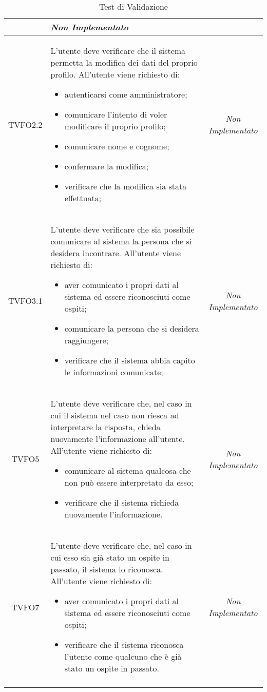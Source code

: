 \begin{longtable}{|c|>{}m{8cm}|c|}
\begin{itemize}
	\end{itemize} & \textit{Non Implementato}\\ \hline
	\hypertarget{TVFO2.2}{TVFO2.2} & L'utente deve verificare che il sistema permetta la modifica dei dati del proprio profilo. All'utente viene richiesto di:
	\begin{itemize}
		\item autenticarsi come amministratore;
		\item comunicare l'intento di voler modificare il proprio profilo;
		\item comunicare nome e cognome;
		\item confermare la modifica;
		\item verificare che la modifica sia stata effettuata;
	\end{itemize}
	& \textit{Non Implementato}\\ \hline
	\hypertarget{TVFO3.1}{TVFO3.1} & L'utente deve verificare che sia possibile comunicare al sistema la persona che si desidera incontrare. All'utente viene richiesto di:
	\begin{itemize}
		\item aver comunicato i propri dati al sistema ed essere riconosciuti come ospiti;
		\item comunicare la persona che si desidera raggiungere;
		\item verificare che il sistema abbia capito le informazioni comunicate;
	\end{itemize} & \textit{Non Implementato}\\ \hline
	\hypertarget{TVFO5}{TVFO5} & L'utente deve verificare che, nel caso in cui il sistema nel caso non riesca ad interpretare la risposta, chieda nuovamente l'informazione all'utente. All'utente viene richiesto di:
	\begin{itemize}
		\item comunicare al sistema qualcosa che non può essere interpretato da esso;
		\item verificare che il sistema richieda nuovamente l'informazione.
	\end{itemize} & \textit{Non Implementato}\\ \hline
	\hypertarget{TVFO7}{TVFO7} & L'utente deve verificare che, nel caso in cui esso sia già stato un ospite in passato, il sistema lo riconosca. All'utente viene richiesto di:
	\begin{itemize}
		\item aver comunicato i propri dati al sistema ed essere riconosciuti come ospiti;
		\item verificare che il sistema riconosca l'utente come qualcuno che è già stato un ospite in passato.
	\end{itemize}
	& \textit{Non Implementato}\\ \hline
	\caption[Test di Validazione]{Test di Validazione}
	\label{tabella:test0}
\end{longtable}
\clearpage

